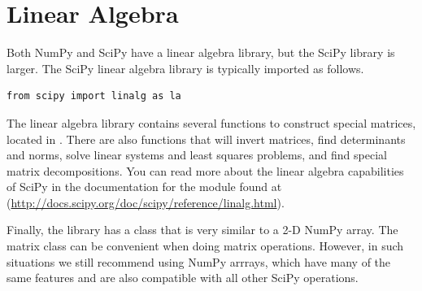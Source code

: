 \section*{Linear Algebra}
Both NumPy and SciPy have a linear algebra library, but the SciPy library is larger. The SciPy linear algebra library is typically imported as follows.

\begin{lstlisting}
from scipy import linalg as la
\end{lstlisting}

The linear algebra library contains several functions to construct special 
matrices, located in 
. There are also functions that will invert matrices, find determinants and norms, solve linear systems and least squares problems, and find special matrix decompositions. You can read more about the linear algebra capabilities of SciPy in the 
documentation for the  module found at
(\url{http://docs.scipy.org/doc/scipy/reference/linalg.html}).

Finally, the  library has a  class that is very 
similar to a 2-D NumPy array. The matrix class can be convenient when doing matrix 
operations. However, in such situations we still recommend using NumPy arrrays, which have many of the same features and are also compatible with all other SciPy operations.

